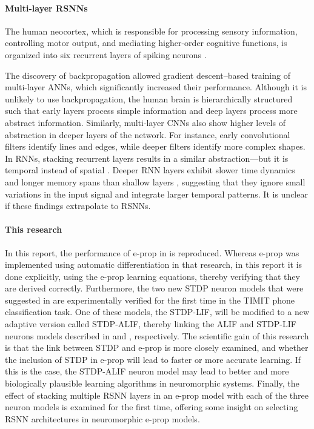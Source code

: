 \paragraph{Multi-layer RSNNs}
The human neocortex, which is responsible for processing sensory information, controlling motor output, and mediating higher-order cognitive functions, is organized into six recurrent layers of spiking neurons \citep{greig2013molecular}.

The discovery of backpropagation allowed gradient descent--based training of multi-layer ANNs, which significantly increased their performance.
Although it is unlikely to use backpropagation, the human brain is hierarchically structured such that early layers process simple information and deep layers process more abstract information.
Similarly, multi-layer CNNs also show higher levels of abstraction in deeper layers of the network.
For instance, early convolutional filters identify lines and edges, while deeper filters identify more complex shapes.
In RNNs, stacking recurrent layers results in a similar abstraction---but it is temporal instead of spatial \citep{hermans2013training,gallicchio2017deep}.
Deeper RNN layers exhibit slower time dynamics and longer memory spans than shallow layers \citep{gallicchio2018short}, suggesting that they ignore small variations in the input signal and integrate larger temporal patterns.
It is unclear if these findings extrapolate to RSNNs.

\paragraph{This research}
In this report, the performance of e-prop in \citet{bellec2020solution} is reproduced.
Whereas e-prop was implemented using automatic differentiation in that research, in this report it is done explicitly, using the e-prop learning equations, thereby verifying that they are derived correctly.
Furthermore, the two new STDP neuron models that were suggested in \citet{traub2020learning} are experimentally verified for the first time in the TIMIT phone classification task.
One of these models, the STDP-LIF, will be modified to a new adaptive version called STDP-ALIF, thereby linking the ALIF and STDP-LIF neurons models described in \citet{bellec2020solution} and \citet{traub2020learning}, respectively.
The scientific gain of this research is that the link between STDP and e-prop is more closely examined, and whether the inclusion of STDP in e-prop will lead to faster or more accurate learning.
If this is the case, the STDP-ALIF neuron model may lead to better and more biologically plausible learning algorithms in neuromorphic systems.
Finally, the effect of stacking multiple RSNN layers in an e-prop model with each of the three neuron models is examined for the first time, offering some insight on selecting RSNN architectures in neuromorphic e-prop models.

